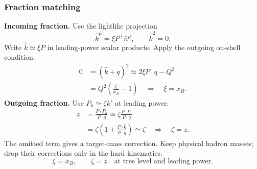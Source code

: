\documentclass[14pt,a4paper]{extarticle}
\numberwithin{equation}{section}
\begin{document}
\subsubsection{Fraction matching}
\textbf{Incoming fraction.} Use the lightlike projection
\begin{equation}
 \hat k^\mu=\xi P^+\bar n^\mu,\qquad\hat k^2=0.
 \label{eq:sidis-hard-projections}
\end{equation}
Write $\hat k\simeq\xi P$ in leading-power scalar products.
Apply the outgoing on-shell condition:
\begin{align}
 0&=(\hat k+q)^2\simeq2\xi P\cdot q-Q^2\\
 &=Q^2\left(\frac{\xi}{x_B}-1\right)
 \quad\Rightarrow\quad \boxed{\xi=x_B}.
\end{align}
\textbf{Outgoing fraction.} Use $P_h\simeq\zeta k'$ at leading power:
\begin{align}
 z&=\frac{P\cdot P_h}{P\cdot q}
 \simeq\zeta\frac{P\cdot k'}{P\cdot q}\\
 &=\zeta\left(1+\frac{P\cdot\hat k}{P\cdot q}\right)
 \simeq\zeta
 \quad\Rightarrow\quad \boxed{\zeta=z}.
\end{align}
The omitted term gives a target-mass correction. Keep physical hadron
masses; drop their corrections only in the hard kinematics.
\begin{equation}
 \boxed{\xi=x_B,\qquad\zeta=z\quad
 \text{at tree level and leading power}.}
 \label{eq:sidis-fraction-matching}
\end{equation}
\end{document}
